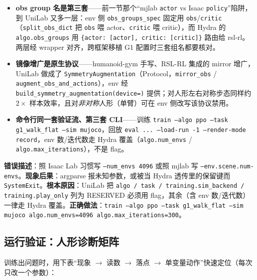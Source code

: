 \begin{itemize}
  \item \textbf{obs group 名是第三套}——前一节那个“mjlab \texttt{actor} vs Isaac \texttt{policy}”陷阱，到 UniLab 又多一层：env 侧 \texttt{obs\_groups\_spec} 固定用 \texttt{obs}/\texttt{critic}（\texttt{split\_obs\_dict} 把 \texttt{obs} 喂 actor、\texttt{critic} 喂 critic），而 Hydra 的 \texttt{algo.obs\_groups} 用 \texttt{\{actor: [actor], critic: [critic]\}} 路由给 rsl-rl。两层经 wrapper 对齐，跨框架移植 G1 配置时三套组名都要核对。
  \item \textbf{镜像增广是原生协议}——humanoid-gym 手写、RSL-RL 集成的 mirror 增广，UniLab 做成了 \texttt{SymmetryAugmentation}（Protocol，\texttt{mirror\_obs} / \texttt{augment\_obs\_and\_actions}），env 经 \texttt{build\_symmetry\_augmentation(device=)} 提供；对人形左右对称步态同样约 $2\times$ 样本效率，且对\emph{非对称}人形（单臂）可在 env 侧改写该协议禁用。
  \item \textbf{命令行同一套验证流、第三套 CLI}——训练 \texttt{train --algo ppo --task g1\_walk\_flat --sim mujoco}，回放 \texttt{eval ... --load-run -1 --render-mode record}，env 数/迭代数走 Hydra 覆盖（\texttt{algo.num\_envs} / \texttt{algo.max\_iterations}），不是 flag。
\end{itemize}

\begin{pitfall}
\textbf{错误描述}：照 Isaac Lab 习惯写 \texttt{--num\_envs 4096} 或照 mjlab 写 \texttt{--env.scene.num-envs}。\textbf{现象后果}：argparse 报未知参数，或被当 Hydra 透传里的保留键而 \texttt{SystemExit}。\textbf{根本原因}：UniLab 把 \texttt{algo / task / training.sim\_backend / training.play\_only} 列为 RESERVED 必须用 flag，其余（含 env 数/迭代数）一律走 Hydra 覆盖。\textbf{正确做法}：\texttt{train --algo ppo --task g1\_walk\_flat --sim mujoco algo.num\_envs=4096 algo.max\_iterations=300}。
\end{pitfall}

\subsection{运行验证：人形诊断矩阵}
训练出问题时，用下表“现象 $\to$ 读数 $\to$ 落点 $\to$ 单变量动作”快速定位（每次只改一个参数）：

